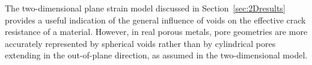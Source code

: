 \documentclass[pdflatex,sn-mathphys-num]{sn-jnl}%
\theoremstyle{thmstyleone}%
\theoremstyle{thmstyletwo}%
\theoremstyle{thmstylethree}%
\begin{document}

The two-dimensional plane strain model discussed in Section~\ref{sec:2Dresults} provides a useful indication of the general influence of voids on the effective crack resistance of a material. However, in real porous metals, pore geometries are more accurately represented by spherical voids rather than by cylindrical pores extending in the out-of-plane direction, as assumed in the two-dimensional model.
\end{document}
